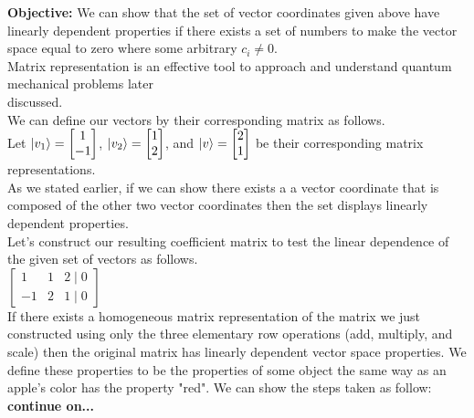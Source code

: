 \documentclass[11pt]{article}
\begin{document}
\begin{text}
{\bf Objective: }
We can show that the set of vector coordinates given above have linearly dependent properties if there exists a set of numbers to make the vector space equal to zero where some arbitrary $c_i \neq 0$. \\

Matrix representation is an effective tool to approach and understand quantum mechanical problems later \\ discussed. \\
We can define our vectors by their corresponding matrix as follows. \\

Let $\ket{v_1} = \begin{bmatrix} 1 \\ -1\end{bmatrix}$, $\ket{v_2} = \begin{bmatrix} 1 \\ 2\end{bmatrix}$, and $\ket{v} = 
\begin{bmatrix} 2 \\ 1\end{bmatrix}$ be their corresponding matrix representations.\\

As we stated earlier, if we can show there exists a a vector coordinate that is composed of the other two vector coordinates then the set displays linearly dependent properties. \\
Let's construct our resulting coefficient matrix to test the linear dependence of the given set of vectors as follows. \\

$\begin{bmatrix} 1 & 1 & 2 \mid 0\\ -1 & 2 & 1 \mid 0 \end{bmatrix}$ \\

If there exists a homogeneous matrix representation of the matrix we just constructed using only the three elementary row operations (add, multiply, and scale) then the original matrix has linearly dependent vector space properties. We define these properties to be the properties of some object the same way as an apple's color has the property "red". We can show the steps taken as follow: \\

{\bf continue on...} \\


\end{text}
\end{document}
